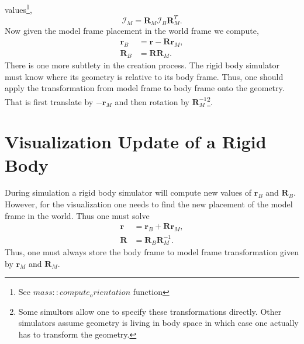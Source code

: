 \documentclass[twocolumn]{article}
\renewcommand{\vec}[1]{ \ensuremath{\mathbf{#1} } }
\newcommand{\mat}[1]{\ensuremath{\mathbf{#1} }}
\newcommand{\inertia}{\ensuremath{\mathcal{I} }}
\begin{document}
values\footnote{See $mass::compute_orientation$ function},
\begin{equation}
  \inertia_M  = \mat R_M \inertia_B \mat R_M^T.
\end{equation}
Now given the model frame placement in the world frame we compute,
\begin{subequations}
  \begin{align}
    \vec r_B &= \vec r - \mat R \vec r_M, \\
    \mat R_B &= \mat R \mat R_M.
  \end{align}
\end{subequations}
There is one more subtlety in the creation process. The rigid body simulator
must know where its geometry is relative to its body frame. Thus, one should
apply the transformation from model frame to body frame onto the geometry. That
is first translate by $- \vec r_M$ and then rotation by $\mat
R_M^{-1}$\footnote{Some simultors allow one to specify these transformations
  directly. Other simulators assume geometry is living in body space in which
  case one actually has to transform the geometry.}.

\section*{Visualization Update of a Rigid Body}\label{sec:visualization-update}
During simulation a rigid body simulator will compute new values of $\vec r_B$
and $\mat R_B$. However, for the visualization one needs to find the new
placement of the model frame in the world. Thus one must solve
\begin{subequations}
  \begin{align}
    \vec r  &= \vec r_B + \mat R \vec r_M, \\
    \mat R &= \mat R_B \mat R_M^{-1}.
  \end{align}
\end{subequations}
Thus, one must always store the body frame to model frame transformation given
by $\vec r_M$ and $\mat R_M$.
\end{document}
